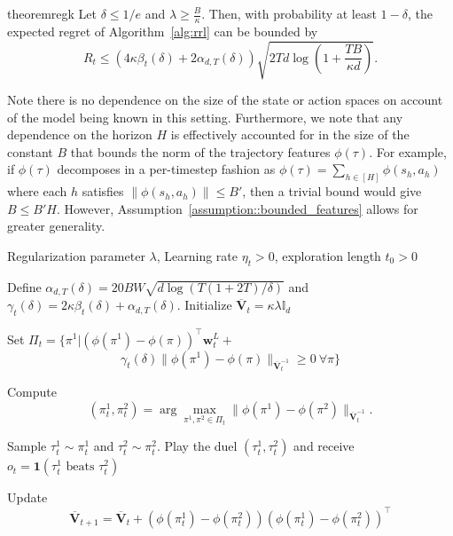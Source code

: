 \begin{restatable}[]{theorem}{regk}
\label{thm::regret-known}
Let $\delta \leq 1/e$ and $\lambda \geq \frac{B}{\kappa}$. Then, with probability at least $1 - \delta$, the expected regret of Algorithm~\ref{alg:rrl} can be bounded by
\begin{equation*}
   R_t \leq \left(4\kappa \beta_t(\delta) + 2\alpha_{d,T}(\delta)  \right) \sqrt{2Td \log\left( 1+ \frac{TB}{ \kappa d}\right) } .
\end{equation*}
\end{restatable}

Note there is no dependence on the size of the state or action spaces on account of the model being known in this setting. Furthermore,  we note that any dependence on the horizon $H$ is effectively accounted for in the size of the constant $B$ that bounds the norm of the trajectory features $\phi(\tau)$. For example, if $\phi(\tau)$ decomposes in a per-timestep fashion as $\phi(\tau) = \sum_{h \in [H]} \phi(s_h, a_h)$ where each $h$ satisfies $\| \phi(s_h, a_h)\| \leq B'$, then a trivial bound would give $B \leq B' H$. However, Assumption~\ref{assumption::bounded_features} allows for greater generality.

\begin{algorithm}[h]
   \caption{\textbf{LPbRL: Regret minimization (Known Model)}}
   \label{alg:rrl}
\begin{algorithmic}[1]
   Regularization parameter $\lambda$, Learning rate $\eta_t >0$, exploration length $t_0>0$

  \STATE Define $\alpha_{d,T}(\delta) = 20 B W\sqrt{d \log(T(1 + 2 T)/\delta)} $ and $\gamma_t(\delta) =2\kappa\beta_t(\delta) + \alpha_{d, T}(\delta) $.
  \STATE Initialize $\overline {\mathbf V}_t = \kappa \lambda \mathbb{I}_d$ 

    \STATE Set $\Pi_t = \{ \pi^1 | (\phi(\pi^1) - \phi(\pi))^\top {\mathbf w}_t^L + $
$$\gamma_t(\delta)  \| \phi(\pi^1) - \phi(\pi) \|_{\overline{\mathbf{V}}_t^{-1}} \geq 0 ~\forall \pi \}$$

\STATE Compute $$(\pi_t^1, \pi_t^2) = \arg\max_{ \pi^1, \pi^2 \in \Pi_t} \| \phi(\pi^1) - \phi(\pi^2) \|_{\overline {\mathbf V}_t^{-1}}.$$

    \STATE Sample $\tau_t^1 \sim \pi_t^1$ and $\tau_t^2 \sim \pi_t^2$.
    \STATE Play the duel $(\tau_t^1,\tau_t^2)$ and receive $o_t = {\mathbf 1}(\tau_t^1 \text{ beats } \tau_t^2)$

    \STATE Update $$\overline {\mathbf V}_{t+ 1} = \overline {\mathbf V}_t + (\phi(\pi_t^1)-\phi(\pi_t^2 ))(\phi(\pi_t^1)-\phi(\pi_t^2))^\top$$ \label{line::vtbar}

  \ENDFOR
\end{algorithmic}
\end{algorithm}

